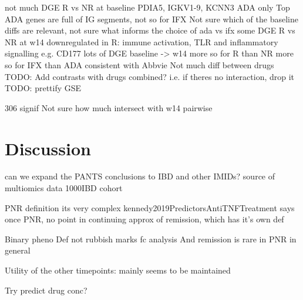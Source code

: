 \begin{outline}
not much DGE R vs NR at baseline
PDIA5, IGKV1-9, KCNN3 ADA only
Top ADA genes are full of IG segments, not so for IFX
Not sure which of the baseline diffs are relevant, not sure what informs the choice of ada vs ifx
some DGE R vs NR at w14
downregulated in R: immune activation, TLR and inflammatory signalling
e.g. CD177
lots of DGE baseline -> w14
more so for R than NR
more so for IFX than ADA
consistent with Abbvie
Not much diff between drugs
TODO: Add contrasts with drugs combined?
i.e. if theres no interaction, drop it
TODO: prettify GSE

306 signif
Not sure how much intersect with w14 pairwise

\section{Discussion}


%

\1 can we expand the PANTS conclusions to IBD and other IMIDs?
\1 source of multiomics data 1000IBD cohort \autocite{imhann20191000IBDProjectMultiomics}

PNR definition
    its very complex
    kennedy2019PredictorsAntiTNFTreatment says once PNR, no point in continuing
        approx of remission, which has it's own def

    Binary pheno Def not rubbish
        marks fc analysis
        And remission is rare in PNR in general

Utility of the other timepoints:
    mainly seems to be maintained

Try predict drug conc?


\end{outline}
